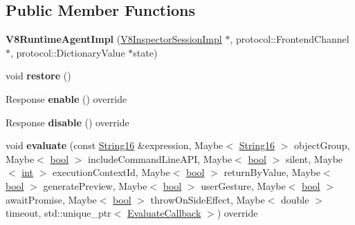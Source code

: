 \subsection*{Public Member Functions}
\begin{DoxyCompactItemize}
\item 
\mbox{\label{classv8__inspector_1_1V8RuntimeAgentImpl_a3c8b6ba7059581f0dd71b75b1cc99806}} 
{\bfseries V8\+Runtime\+Agent\+Impl} (\mbox{\hyperlink{classv8__inspector_1_1V8InspectorSessionImpl}{V8\+Inspector\+Session\+Impl}} $\ast$, protocol\+::\+Frontend\+Channel $\ast$, protocol\+::\+Dictionary\+Value $\ast$state)
\item 
\mbox{\label{classv8__inspector_1_1V8RuntimeAgentImpl_a2fbc238e620779f822973a56cd8ea233}} 
void {\bfseries restore} ()
\item 
\mbox{\label{classv8__inspector_1_1V8RuntimeAgentImpl_aa4bb142d23b0e3b3d18fa3b18edf6243}} 
Response {\bfseries enable} () override
\item 
\mbox{\label{classv8__inspector_1_1V8RuntimeAgentImpl_a02457be2c1c60c0a451a372fbdc084a0}} 
Response {\bfseries disable} () override
\item 
\mbox{\label{classv8__inspector_1_1V8RuntimeAgentImpl_afbafae02e9b326438d6896c5bbfb1ee8}} 
void {\bfseries evaluate} (const \mbox{\hyperlink{classv8__inspector_1_1String16}{String16}} \&expression, Maybe$<$ \mbox{\hyperlink{classv8__inspector_1_1String16}{String16}} $>$ object\+Group, Maybe$<$ \mbox{\hyperlink{classbool}{bool}} $>$ include\+Command\+Line\+A\+PI, Maybe$<$ \mbox{\hyperlink{classbool}{bool}} $>$ silent, Maybe$<$ \mbox{\hyperlink{classint}{int}} $>$ execution\+Context\+Id, Maybe$<$ \mbox{\hyperlink{classbool}{bool}} $>$ return\+By\+Value, Maybe$<$ \mbox{\hyperlink{classbool}{bool}} $>$ generate\+Preview, Maybe$<$ \mbox{\hyperlink{classbool}{bool}} $>$ user\+Gesture, Maybe$<$ \mbox{\hyperlink{classbool}{bool}} $>$ await\+Promise, Maybe$<$ \mbox{\hyperlink{classbool}{bool}} $>$ throw\+On\+Side\+Effect, Maybe$<$ double $>$ timeout, std\+::unique\+\_\+ptr$<$ \mbox{\hyperlink{classv8__inspector_1_1EvaluateCallback}{Evaluate\+Callback}} $>$) override

\end{DoxyCompactItemize}
